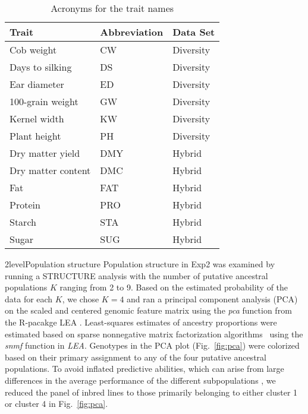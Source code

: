 \documentclass[12pt,titlepage]{article}
\begin{document}
\begin{table}[]
\centering
\caption{Acronyms for the trait names}
\label{table:TraitKey}
\begin{tabular}{@{}lll@{}}
\toprule
Trait              & Abbreviation & Data Set  \\ \midrule
Cob weight         & CW           & Diversity \\
Days to silking    & DS           & Diversity \\
Ear diameter       & ED           & Diversity \\
100-grain weight   & GW           & Diversity \\
Kernel width       & KW           & Diversity \\
Plant height       & PH           & Diversity \\
Dry matter yield   & DMY          & Hybrid    \\
Dry matter content & DMC          & Hybrid    \\
Fat                & FAT          & Hybrid    \\
Protein            & PRO          & Hybrid    \\
Starch             & STA          & Hybrid    \\
Sugar              & SUG          & Hybrid    \\ \bottomrule
\end{tabular}
\end{table}


\Genetics2level{Population structure}
Population structure in Exp2 was examined by running a STRUCTURE
\cite{Pritchard2000} analysis with the number of putative ancestral
populations $K$ ranging from 2 to 9.
Based on the estimated probability of the data for each $K$, we chose $K=4$
and ran a principal component analysis (PCA) on the scaled and centered
genomic feature matrix using the \emph{pca} function from the R-pacakge LEA
\cite{Frichot2015}.
Least-squares estimates of ancestry proportions were estimated based on sparse 
nonnegative matrix factorization algorithms~\cite{Frichot2014} using the 
\emph{snmf} function in \textit{LEA}.
Genotypes in the PCA plot (Fig.~\ref{fig:pca}) were colorized based on their
primary assignment to any of the four putative ancestral populations.
To avoid inflated predictive abilities, which can arise from large differences
in the average performance of the different subpopulations
\cite{Windhausen2012}, we reduced the panel of inbred lines to those primarily
belonging to either cluster 1 or cluster 4 in Fig.~\ref{fig:pca}.
\end{document}
